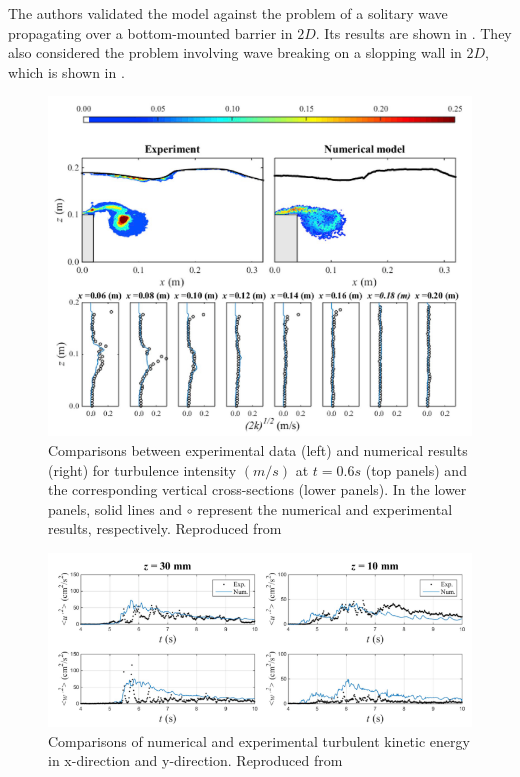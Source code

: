 The authors validated the model against the problem of a solitary wave propagating over a bottom-mounted barrier in $2D$. Its results are shown in . They also considered the problem involving wave breaking on a slopping wall in $2D$, which is shown in .
\begin{figure}[htbp!]
    \centering
    \includegraphics[scale=0.75]{Figures/research_papers/Wang2020-wave-propogation-result.png}
    \caption{Comparisons between experimental data (left) and numerical results (right) for turbulence intensity $(m/s)$ at $t=0.6s$ (top panels) and the corresponding vertical cross-sections (lower panels). In the lower panels, solid lines and $\circ$ represent the numerical and experimental results, respectively. Reproduced from \cite{Wang2020}}
    \label{fig:Wang2020-wave-propogation-result}
\end{figure}
\begin{figure}[htbp!]
    \centering
    \includegraphics[scale=0.8]{Figures/research_papers/Wang2020-wave-breaking-result.png}
    \caption{Comparisons of numerical and experimental turbulent kinetic energy in x-direction and y-direction. Reproduced from \cite{Wang2020}}
    \label{fig:Wang2020-wave-breaking-result}
\end{figure}

